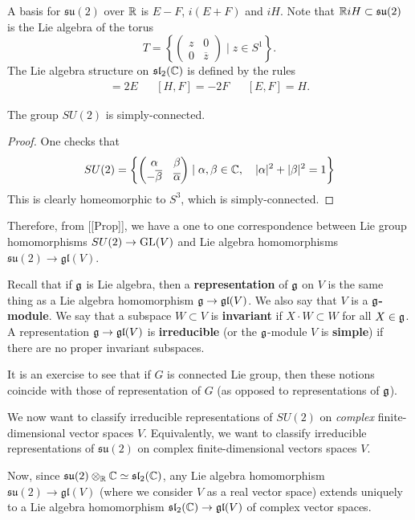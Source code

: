 \documentclass[11pt, english]{article}
\begin{document}
A basis for $\mathfrak{su}(2)$ over $\mathbb{R}$ is $E-F$, $i(E+F)$ and $iH$. Note that $\mathbb{R} i H \subset \mathfrak{su}(2)$ is the Lie algebra of the torus 
$$
T = \left\{ \begin{pmatrix}
z & 0 \\
0 & \overline z 
\end{pmatrix} \mid z \in S^1
\right\}.
$$
The Lie algebra structure on $\mathfrak{sl}_2(\mathbb{C})$ is defined by the rules
\begin{align*}
[H,E] = 2E && [H,F] = -2F && [E,F] = H.
\end{align*}

\begin{lemma}
The group $SU(2)$ is simply-connected.
\end{lemma}
\begin{proof}
One checks that
$$
SU(2) =\left\{ \begin{pmatrix}
\alpha & \beta \\
-\overline \beta & \overline \alpha 
\end{pmatrix}
\mid \alpha, \beta \in \mathbb{C}, \quad |\alpha|^2 + |\beta|^2 = 1
\right\}
$$
This is clearly homeomorphic to $S^3$, which is simply-connected.
\end{proof}

Therefore, from [[Prop]], we have a one to one correspondence between Lie group homomorphisms $SU(2) \to \operatorname{GL}(V)$ and Lie algebra homomorphisms $\mathfrak{su}(2) \to \mathfrak{gl}(V)$.

Recall that if $\mathfrak g$ is Lie algebra, then a \textbf{representation} of $\mathfrak g$ on $V$ is the same thing as a Lie algebra homomorphism $\mathfrak g \to \mathfrak{gl}(V)$. We also say that $V$ is a \textbf{$\mathfrak g$-module}. We say that a subspace $W \subset V$ is \textbf{invariant} if $X \cdot W \subset W$ for all $X \in \mathfrak g$. A representation $\mathfrak g \to \mathfrak{gl}(V)$ is \textbf{irreducible} (or the $\mathfrak g$-module $V$ is \textbf{simple}) if there are no proper invariant subspaces.

It is an exercise to see that if $G$ is connected Lie group, then these notions coincide with those of representation of $G$ (as opposed to representations of $\mathfrak g$).

We now want to classify irreducible representations of $SU(2)$ on \emph{complex} finite-dimensional vector spaces $V$. Equivalently, we want to classify irreducible representations of $\mathfrak{su}(2)$ on complex finite-dimensional vectors spaces $V$. 

Now, since $\mathfrak{su}(2) \otimes_{\mathbb{R}} \mathbb{C} \simeq \mathfrak{sl}_2(\mathbb{C})$, any Lie algebra homomorphism $\mathfrak{su}(2) \to \mathfrak{gl}(V)$ (where we consider $V$ as a real vector space) extends uniquely to a Lie algebra homomorphism $\mathfrak{sl}_2(\mathbb{C}) \to \mathfrak{gl}(V)$ of complex vector spaces.
\end{document}
